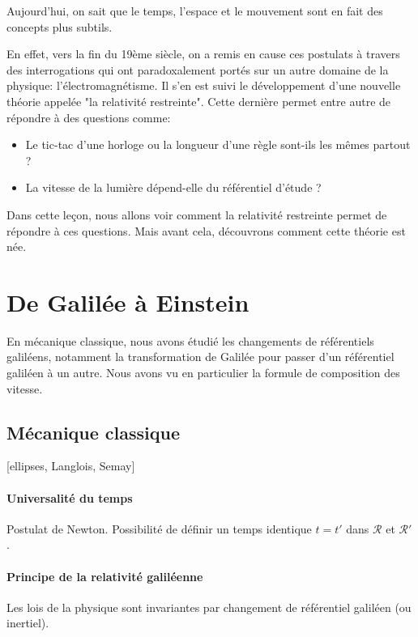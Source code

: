 \documentclass[11pt]{report}
\numberwithin{figure}{section}
\numberwithin{equation}{section}
\numberwithin{table}{section}
\newcommand{\1}{\boldsymbol{1}}
\begin{document}
Aujourd'hui, on sait que le temps, l'espace et le mouvement sont en fait des concepts plus subtils. 

En effet, vers la fin du 19ème siècle, on a remis en cause ces postulats à travers des interrogations qui ont paradoxalement portés sur un autre domaine de la physique: l'électromagnétisme. Il s'en est suivi le développement d'une nouvelle théorie appelée "la relativité restreinte". Cette dernière permet entre autre de répondre à des questions comme:
\begin{itemize}
\item Le tic-tac d'une horloge ou la longueur d'une règle sont-ils les mêmes partout ?
\item La vitesse de la lumière dépend-elle du référentiel d'étude ?
\end{itemize}

Dans cette leçon, nous allons voir comment la relativité restreinte permet de répondre à ces questions. Mais avant cela, découvrons comment cette théorie est née.
  



\section{De Galilée à Einstein}

En mécanique classique, nous avons étudié les changements de référentiels galiléens, notamment la transformation de Galilée pour passer d’un référentiel galiléen à un autre. Nous avons vu en particulier la formule de composition des vitesse. 

\subsection{Mécanique classique}

[ellipses, Langlois, Semay]

\paragraph{Universalité du temps} Postulat de Newton. Possibilité de définir un temps identique $t = t'$ dans $\mathcal{R}$ et $\mathcal{R}'$.

\paragraph{Principe de la relativité galiléenne} Les lois de la physique sont invariantes par changement de référentiel galiléen (ou inertiel).
\end{document}
